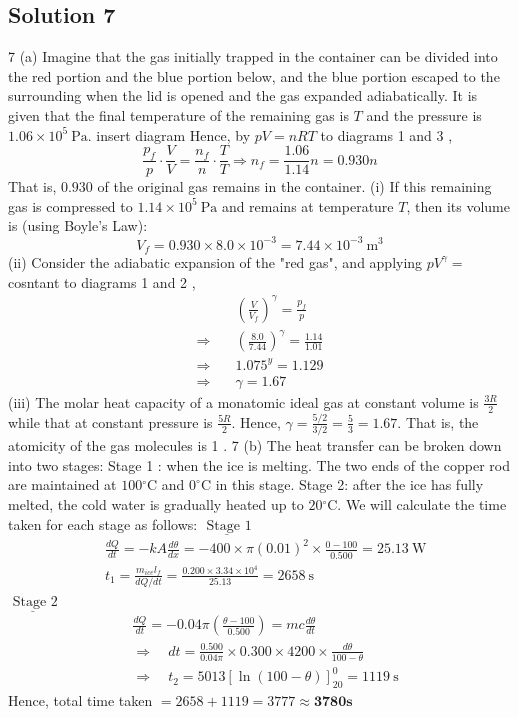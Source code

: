 \documentclass{article}
\begin{document}
\subsection{Solution 7}
7 (a) Imagine that the gas initially trapped in the container can be divided into the red portion and the blue portion below, and the blue portion escaped to the surrounding when the lid is opened and the gas expanded adiabatically. It is given that the final temperature of the remaining gas is $T$ and the pressure is $1.06 \times 10^{5} \mathrm{~Pa}$.
insert diagram
Hence, by $p V=n R T$ to diagrams 1 and 3 ,
$$
\frac{p_{f}}{p} \cdot \frac{V}{V}=\frac{n_{f}}{n} \cdot \frac{T}{T} \Rightarrow n_{f}=\frac{1.06}{1.14} n=0.930 n
$$
That is, $0.930$ of the original gas remains in the container.
(i) If this remaining gas is compressed to $1.14 \times 10^{5} \mathrm{~Pa}$ and remains at temperature $T$, then its volume is (using Boyle's Law):
$$
V_{f}=0.930 \times 8.0 \times 10^{-3}=7.44 \times 10^{-3} \mathrm{~m}^{3}
$$
(ii) Consider the adiabatic expansion of the "red gas", and applying $p V^{\gamma}=$ cosntant to diagrams 1 and 2 ,
$$
\begin{aligned}
	&\left(\frac{V}{V_{f}}\right)^{\gamma}=\frac{p_{f}}{p} \\
	\Rightarrow &\left(\frac{8.0}{7.44}\right)^{\gamma}=\frac{1.14}{1.01} \\
	\Rightarrow \quad & 1.075^{y}=1.129 \\
	\Rightarrow \quad & \gamma=1.67
\end{aligned}
$$
(iii) The molar heat capacity of a monatomic ideal gas at constant volume is $\frac{3 R}{2}$ while that at constant pressure is $\frac{5 R}{2}$. Hence, $\gamma=\frac{5 / 2}{3 / 2}=\frac{5}{3}=1.67$. That is, the atomicity of the gas molecules is 1 .
7 (b) The heat transfer can be broken down into two stages:
Stage 1 : when the ice is melting. The two ends of the copper rod are maintained at $100{ }^{\circ} \mathrm{C}$ and $0^{\circ} \mathrm{C}$ in this stage.
Stage 2: after the ice has fully melted, the cold water is gradually heated $\mathrm{up}$ to $20{ }^{\circ} \mathrm{C}$.
We will calculate the time taken for each stage as follows:
$\underline{\text { Stage } 1}$
$$
\begin{aligned}
	&\frac{d Q}{d t}=-k A \frac{d \theta}{d x}=-400 \times \pi(0.01)^{2} \times \frac{0-100}{0.500}=25.13 \mathrm{~W} \\
	&t_{1}=\frac{m_{i c e} l_{f}}{d Q / d t}=\frac{0.200 \times 3.34 \times 10^{4}}{25.13}=2658 \mathrm{~s}
\end{aligned}
$$
$\underline{\text { Stage } 2}$
$$
\begin{aligned}
	&\frac{d Q}{d t}=-0.04 \pi\left(\frac{\theta-100}{0.500}\right)=m c \frac{d \theta}{d t} \\
	&\Rightarrow \quad d t=\frac{0.500}{0.04 \pi} \times 0.300 \times 4200 \times \frac{d \theta}{100-\theta} \\
	&\Rightarrow \quad t_{2}=5013[\ln (100-\theta)]_{20}^{0}=1119 \mathrm{~s}
\end{aligned}
$$
Hence, total time taken $=2658+1119=3777 \approx \mathbf{3 7 8 0} \mathbf{s}$
\end{document}
